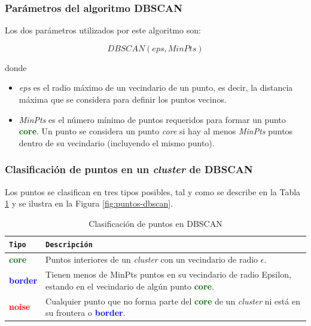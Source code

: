 \newpage

\subsubsection*{Parámetros del algoritmo \gls{DBSCAN}}

Los dos parámetros utilizados por este algoritmo son:

\begin{equation}
    DBSCAN ( eps, MinPts )
\end{equation}

donde

\begin{itemize}
    \item \textit{eps} es el radio máximo de un vecindario de un punto, es decir, la distancia máxima que se considera para definir los puntos vecinos.
    \item \textit{MinPts} es el número mínimo de puntos requeridos para formar un punto {\textcolor{darkgreen}{\textbf{core}}}. Un punto se considera un punto \textit{core} si hay al menos \textit{MinPts} puntos dentro de su vecindario (incluyendo el mismo punto).
\end{itemize}

\subsubsection*{Clasificación de puntos en un \textit{cluster} de \gls{DBSCAN}}

Los puntos se clasifican en tres tipos posibles, tal y como se describe en la Tabla \ref{tab:dbscan} y se ilustra en la Figura \ref{fig:puntos-dbscan}.

\begin{table}[H]
\centering
\footnotesize
\renewcommand{\arraystretch}{1.1}
\begin{tabularx}{\textwidth}{|p{3cm}|X|}
\hline
\rowcolor{graylight}\texttt{Tipo} & \texttt{Descripción} \\
\hline
\textbf{\textcolor{darkgreen}{\textbf{core}}} & Puntos interiores de un \textit{cluster} con un vecindario de radio $\epsilon$. \\
\hline
\textbf{\textcolor{blue}{\textbf{border}}} & Tienen menos de MinPts puntos en su vecindario de radio Epsilon, estando en el vecindario de algún punto \textcolor{darkgreen}{\textbf{core}}. \\
\hline
\textbf{\textcolor{red}{\textbf{noise}}} & Cualquier punto que no forma parte del \textcolor{darkgreen}{\textbf{core}} de un \textit{cluster} ni está en su frontera o \textcolor{blue}{\textbf{border}}. \\
\hline
\end{tabularx}
\caption{Clasificación de puntos en DBSCAN}
\label{tab:dbscan}
\end{table}


